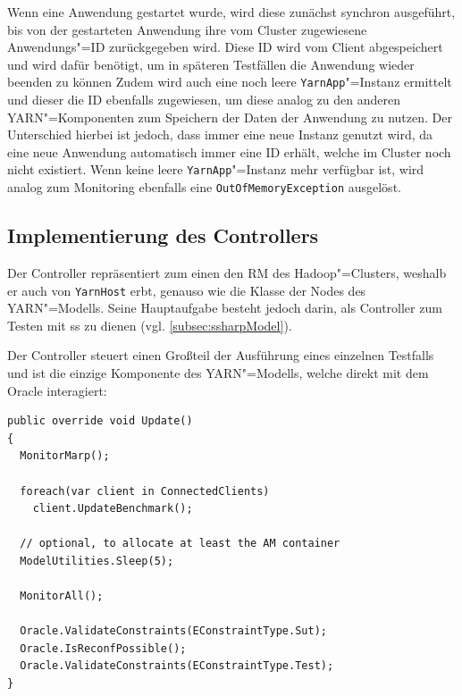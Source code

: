 Wenn eine \gls{Anwendung} gestartet wurde, wird diese zunächst synchron ausgeführt, bis von der gestarteten \gls{Anwendung} ihre vom Cluster zugewiesene Anwendungs"=ID zurückgegeben wird.
Diese ID wird vom Client abgespeichert und wird dafür benötigt, um in späteren Testfällen die \gls{Anwendung} wieder beenden zu können
Zudem wird auch eine noch leere \texttt{YarnApp}"=Instanz ermittelt und dieser die ID ebenfalls zugewiesen, um diese analog zu den anderen \gls{YARN}"=Komponenten zum Speichern der Daten der \gls{Anwendung} zu nutzen.
Der Unterschied hierbei ist jedoch, dass immer eine neue Instanz genutzt wird, da eine neue \gls{Anwendung} automatisch immer eine ID erhält, welche im Cluster noch nicht existiert.
Wenn keine leere \texttt{YarnApp}"=Instanz mehr verfügbar ist, wird analog zum Monitoring ebenfalls eine \texttt{OutOfMemoryException} ausgelöst.

\subsection{Implementierung des Controllers}
\label{subsec:yarnController}

Der Controller repräsentiert zum einen den \gls{RM} des Hadoop"=Clusters, weshalb er auch von \texttt{YarnHost} erbt, genauso wie die Klasse der Nodes des \gls{YARN}"=Modells.
Seine Hauptaufgabe besteht jedoch darin, als Controller zum Testen mit \gls{ss} zu dienen (vgl. \cref{subsec:ssharpModel}).

Der Controller steuert einen Großteil der Ausführung eines einzelnen Testfalls und ist die einzige Komponente des \gls{YARN}"=Modells, welche direkt mit dem Oracle interagiert:

\begin{lstlisting}[label=lst:controllerUpdate,style=cs,
caption={[Update()"=Methode des Controllers]
    \texttt{Update()}"=Methode des Controllers (gekürzt).
    Eine ausführliche Beschreibung des Ablaufs der Ausführung eines Testfalls findet sich in \cref{subsec:simulationStep}.}]
public override void Update()
{
  MonitorMarp();
  
  foreach(var client in ConnectedClients)
    client.UpdateBenchmark();
  
  // optional, to allocate at least the AM container
  ModelUtilities.Sleep(5);
  
  MonitorAll();
  
  Oracle.ValidateConstraints(EConstraintType.Sut);
  Oracle.IsReconfPossible();
  Oracle.ValidateConstraints(EConstraintType.Test);
}
\end{lstlisting}

